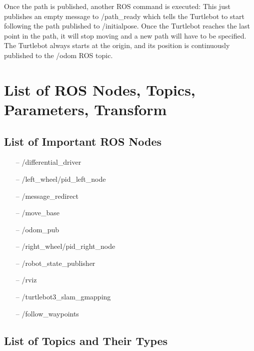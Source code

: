 \documentclass[12]{article}
\begin{document}
Once the path is published, another ROS command is executed:
%
This just publishes an empty message to /path\_ready which tells the Turtlebot to start following the path published to /initialpose. Once the Turtlebot reaches the last point in the path, it will stop moving and a new path will have to be specified. The Turtlebot always starts at the origin, and its position is continuously published to the /odom ROS topic. 

\newpage
\section{List of ROS Nodes, Topics, Parameters, Transform}
\subsection{List of Important ROS Nodes}


\begin{itemize}
    \item[--] /differential\_driver
    \item[--] /left\_wheel/pid\_left\_node
    \item[--] /message\_redirect
    \item[--] /move\_base
    \item[--] /odom\_pub
    \item[--] /right\_wheel/pid\_right\_node
    \item[--] /robot\_state\_publisher
    \item[--] /rviz
    \item[--] /turtlebot3\_slam\_gmapping
    \item[--] /follow\_waypoints 
\end{itemize} 

\subsection{List of Topics and Their Types}
\end{document}
